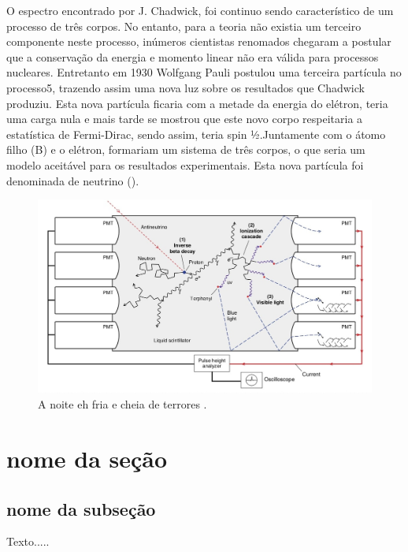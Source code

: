 O espectro encontrado por J. Chadwick, foi continuo sendo característico de um processo de três corpos. No entanto, para a teoria não existia um terceiro componente neste processo, inúmeros cientistas renomados chegaram a postular que a conservação da energia e momento linear não era válida para processos nucleares. Entretanto em 1930 Wolfgang Pauli postulou uma terceira partícula no processo5, trazendo assim uma nova luz sobre os resultados que Chadwick produziu. Esta nova partícula ficaria com a metade da energia do elétron, teria uma carga nula e mais tarde se mostrou que este novo corpo respeitaria a estatística de Fermi-Dirac, sendo assim, teria spin ½.Juntamente com o átomo filho (B) e o elétron, formariam um sistema de três corpos, o que seria um modelo aceitável para os resultados experimentais. Esta nova partícula foi denominada de neutrino (\nu).

\begin{figure}[!h]
\centering
\includegraphics[scale=0.35]{sinal_antineutrino.jpg}
\caption{ A noite eh fria e cheia de terrores \cite{GRIFFITHS}. }
\label{fig:sinal_antineutrino}
\end{figure} 
\section{nome da seção}
\subsection{nome da subseção}
Texto.....